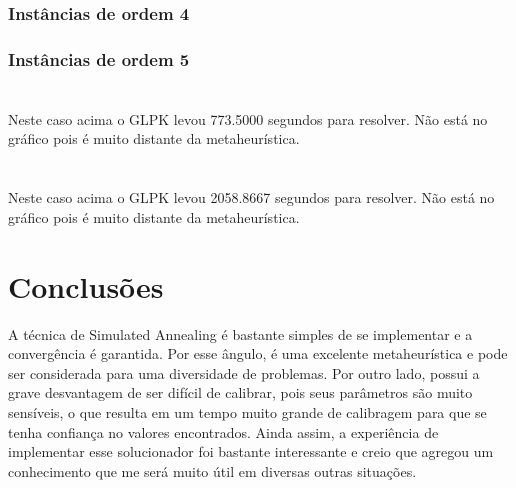 \documentclass[10pt,a4paper,titlepage]{article}
\begin{document}
		\subsubsection{Instâncias de ordem 4}
			\paragraph*{}
			

			\paragraph*{}
			

			\paragraph*{}
			

		\subsubsection{Instâncias de ordem 5}
			\paragraph*{}
			\\
			Neste caso acima o GLPK levou 773.5000 segundos para resolver. Não está no gráfico pois é muito distante da metaheurística.

			\paragraph*{}
			

			\paragraph*{}
			\\
			Neste caso acima o GLPK levou 2058.8667 segundos para resolver. Não está no gráfico pois é muito distante da metaheurística.

			\paragraph*{}
			
	
	\section{Conclusões}
	A técnica de Simulated Annealing é bastante simples de se implementar e a convergência é garantida. Por esse ângulo, é uma excelente metaheurística e pode ser considerada para uma diversidade de problemas. Por outro lado, possui a grave desvantagem de ser difícil de calibrar, pois seus parâmetros são muito sensíveis, o que resulta em um tempo muito grande de calibragem para que se tenha confiança no valores encontrados. Ainda assim, a experiência de implementar esse solucionador foi bastante interessante e creio que agregou um conhecimento que me será muito útil em diversas outras situações.
\clearpage

\end{document}
